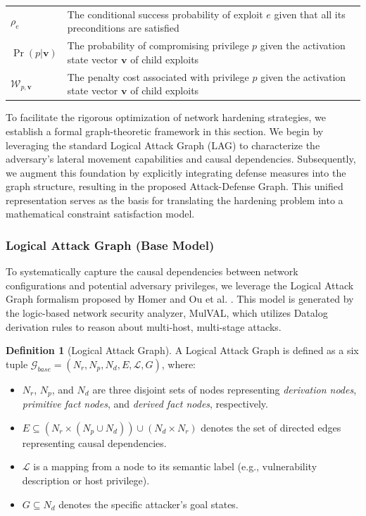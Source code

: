 \documentclass[conference]{IEEEtran}
\theoremstyle{definition} %
\newtheorem{definition}{Definition}
\theoremstyle{plain} %
\begin{document}
\begin{table}[htbp]
\begin{tabular}{p{} p{}}
        
        {\color{red}$\rho_e$} & {\color{red}The conditional success probability of exploit $e$ given that all its preconditions are satisfied} \\
        $\Pr(p|\mathbf{v})$ & The probability of compromising privilege $p$ given the activation state vector $\mathbf{v}$ of child exploits \\
        $\mathcal{W}_{p,\mathbf{v}}$ & The penalty cost associated with privilege $p$ given the activation state vector $\mathbf{v}$ of child exploits \\
        
        \bottomrule
    \end{tabular}
\end{table}

To facilitate the rigorous optimization of network hardening strategies, we establish a formal graph-theoretic framework in this section. We begin by leveraging the standard Logical Attack Graph (LAG) to characterize the adversary's lateral movement capabilities and causal dependencies. Subsequently, we augment this foundation by explicitly integrating defense measures into the graph structure, resulting in the proposed Attack-Defense Graph. This unified representation serves as the basis for translating the hardening problem into a mathematical constraint satisfaction model. 

\subsubsection{Logical Attack Graph (Base Model)}
To systematically capture the causal dependencies between network configurations and potential adversary privileges, we leverage the Logical Attack Graph formalism proposed by Homer and Ou et al. \cite{ou2005mulval, ou2006scalable}. This model is generated by the logic-based network security analyzer, MulVAL, which utilizes Datalog derivation rules to reason about multi-host, multi-stage attacks.

\begin{definition}[Logical Attack Graph]
A Logical Attack Graph is defined as a six tuple $\mathcal{G}_{base} = (N_r, N_p, N_d, E, \mathcal{L}, G)$, where:
\begin{itemize}
    \item $N_r$, $N_p$, and $N_d$ are three disjoint sets of nodes representing \textit{derivation nodes}, \textit{primitive fact nodes}, and \textit{derived fact nodes}, respectively.
    \item $E \subseteq (N_r \times (N_p \cup N_d)) \cup (N_d \times N_r)$ denotes the set of directed edges representing causal dependencies.
    \item $\mathcal{L}$ is a mapping from a node to its semantic label (e.g., vulnerability description or host privilege).
    \item $G \subseteq N_d$ denotes the specific attacker's goal states.
\end{itemize}
\end{definition}
\end{document}
